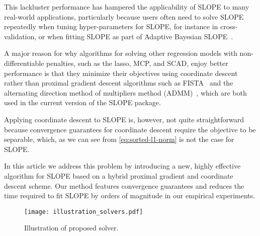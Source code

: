 This lackluster performance has hampered the applicability of SLOPE to many
real-world applications, particularly because users often need to solve SLOPE
repeatedly when tuning hyper-parameters for SLOPE, for instance in
cross-validation, or when fitting SLOPE as part of Adaptive Bayesian
SLOPE~\cite{jiang2022}.

A major reason for why algorithms for solving other regression models with
non-differentiable penalties, such as the lasso, MCP, and SCAD, enjoy better
performance is that they minimize their objectives using coordinate
descent~\cite{breheny2011, friedman2010} rather than proximal gradient descent
algorithms such as FISTA~\cite{beck2009} and the
alternating direction method of multipliers method (ADMM)~\cite{boyd2010},
which are both used in the current version of the SLOPE package.

Applying coordinate descent to SLOPE is, however, not quite straightforward
because convergence guarantees for coordinate descent require the
objective to be separable, which, as we can see from \eqref{eq:sorted-l1-norm}
is not the case for SLOPE. 


In this article we address this problem by introducing a new, highly effective
algorithm for SLOPE based on a hybrid proximal gradient and coordinate descent
scheme. Our method features convergence guarantees and reduces the time
required to fit SLOPE by orders of magnitude in our empirical experiments.

\begin{figure}[htbp]
  \centering
  \texttt{[image: illustration\_solvers.pdf]}
  \caption{Illustration of proposed solver.}
  \label{fig:illustration-solver}
\end{figure}
